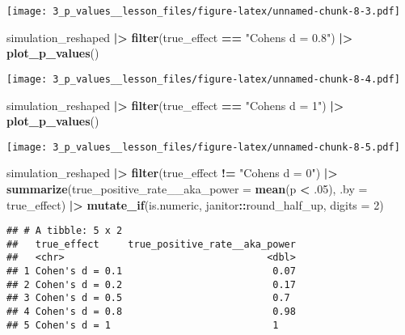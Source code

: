 \documentclass[
]{article}
\newenvironment{Shaded}{\begin{snugshade}}{\end{snugshade}}
\newcommand{\AttributeTok}[1]{\textcolor[rgb]{0.13,0.29,0.53}{#1}}
\newcommand{\DecValTok}[1]{\textcolor[rgb]{0.00,0.00,0.81}{#1}}
\newcommand{\FunctionTok}[1]{\textcolor[rgb]{0.13,0.29,0.53}{\textbf{#1}}}
\newcommand{\NormalTok}[1]{#1}
\newcommand{\SpecialCharTok}[1]{\textcolor[rgb]{0.81,0.36,0.00}{\textbf{#1}}}
\newcommand{\StringTok}[1]{\textcolor[rgb]{0.31,0.60,0.02}{#1}}
\begin{document}
\texttt{[image: 3\_p\_values\_\_lesson\_files/figure-latex/unnamed-chunk-8-3.pdf]}

\begin{Shaded}
\begin{Highlighting}[]
\NormalTok{simulation\_reshaped }\SpecialCharTok{|\textgreater{}}
  \FunctionTok{filter}\NormalTok{(true\_effect }\SpecialCharTok{==} \StringTok{"Cohen\textquotesingle{}s d = 0.8"}\NormalTok{) }\SpecialCharTok{|\textgreater{}}
  \FunctionTok{plot\_p\_values}\NormalTok{()}
\end{Highlighting}
\end{Shaded}

\texttt{[image: 3\_p\_values\_\_lesson\_files/figure-latex/unnamed-chunk-8-4.pdf]}

\begin{Shaded}
\begin{Highlighting}[]
\NormalTok{simulation\_reshaped }\SpecialCharTok{|\textgreater{}}
  \FunctionTok{filter}\NormalTok{(true\_effect }\SpecialCharTok{==} \StringTok{"Cohen\textquotesingle{}s d = 1"}\NormalTok{) }\SpecialCharTok{|\textgreater{}}
  \FunctionTok{plot\_p\_values}\NormalTok{()}
\end{Highlighting}
\end{Shaded}

\texttt{[image: 3\_p\_values\_\_lesson\_files/figure-latex/unnamed-chunk-8-5.pdf]}

\begin{Shaded}
\begin{Highlighting}[]
\NormalTok{simulation\_reshaped }\SpecialCharTok{|\textgreater{}}
  \FunctionTok{filter}\NormalTok{(true\_effect }\SpecialCharTok{!=} \StringTok{"Cohen\textquotesingle{}s d = 0"}\NormalTok{) }\SpecialCharTok{|\textgreater{}}
  \FunctionTok{summarize}\NormalTok{(}\AttributeTok{true\_positive\_rate\_\_aka\_power =} \FunctionTok{mean}\NormalTok{(p }\SpecialCharTok{\textless{}}\NormalTok{ .}\DecValTok{05}\NormalTok{),}
            \AttributeTok{.by =}\NormalTok{ true\_effect) }\SpecialCharTok{|\textgreater{}}
  \FunctionTok{mutate\_if}\NormalTok{(is.numeric, janitor}\SpecialCharTok{::}\NormalTok{round\_half\_up, }\AttributeTok{digits =} \DecValTok{2}\NormalTok{)}
\end{Highlighting}
\end{Shaded}

\begin{verbatim}
## # A tibble: 5 x 2
##   true_effect     true_positive_rate__aka_power
##   <chr>                                   <dbl>
## 1 Cohen's d = 0.1                          0.07
## 2 Cohen's d = 0.2                          0.17
## 3 Cohen's d = 0.5                          0.7 
## 4 Cohen's d = 0.8                          0.98
## 5 Cohen's d = 1                            1
\end{verbatim}
\end{document}
